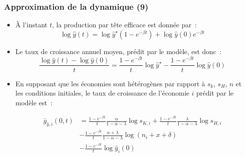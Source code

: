 \documentclass[10pt,notheorems]{beamer}
\theoremstyle{plain}
\theoremstyle{definition} %
\begin{document}
\begin{frame}
  \frametitle{Approximation de la dynamique (9)}

  \begin{itemize}

  \item À l'instant $t$, la production par tête efficace est donnée par~:
    \[
      \log \hat  y(t) = \log \hat y^\star \left(1-e^{-\beta t}\right) + \log\hat y(0) e^{-\beta t}
    \]
    
    \medskip

  \item Le taux de croissance annuel moyen, prédit par le modèle, est donc~:
    \[
      \frac{\log \hat  y(t)-\log \hat  y(0)}{t} = \frac{1-e^{-\beta t}}{t} \log \hat y^\star - \frac{1-e^{-\beta t}}{t} \log\hat y(0)
    \]

    \medskip
    
  \item En supposant que les économies sont hétérogènes par rapport à $s_k$, $s_H$, $n$ et les conditions initiales, le taux de croissance de l'économie $i$ prédit par le modèle est~:

    \medskip

    \[
      \begin{split}
        \bar g_{\hat y,i}(0,t) &= \frac{1-e^{-\beta t}}{t}\frac{\alpha}{1-\alpha-\lambda}\log s_{K,i} + \frac{1-e^{-\beta t}}{t}\frac{\lambda}{1-\alpha-\lambda}\log s_{H,i}\\
                     &- \frac{1-e^{-\beta t}}{t}\frac{\alpha+\lambda}{1-\alpha-\lambda}\log (n_i+x+\delta)\\
        &-\frac{1-e^{-\beta t}}{t} \log\hat y_i(0)
      \end{split}
    \]
  \end{itemize}
\end{frame}
\end{document}
